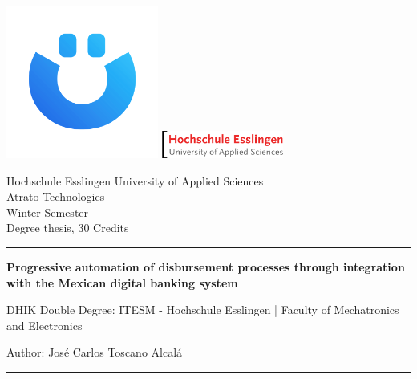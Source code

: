 
\begin{titlepage}
    \hspace{-1.5cm}
	\includegraphics[width=50mm]{assets/logoAtrato.png}
	\hfill
	\includegraphics[width=40mm]{assets/Hochschule-esslingen.svg.png}
	
	\noindent\begin{small} \sffamily
		\begin{minipage}{0.65\textwidth}
			Hochschule Esslingen University of Applied Sciences\\
			Atrato Technologies\\
			Winter Semester \the\year\\
			Degree thesis, 30 Credits\\
		\end{minipage}
	\hrule
	\end{small}

	\vspace{1cm}
	{\LARGE\noindent \textbf{Progressive automation of disbursement processes through integration with the Mexican digital banking system} \par}
	\vspace{0.5cm}
	{\Large\noindent DHIK Double Degree: ITESM - Hochschule Esslingen | Faculty of Mechatronics and Electronics \par}
	\vspace{2cm}
	{\LARGE\noindent Author: José Carlos Toscano Alcalá \par} %

	\vfill
		
	\hrule
	\vspace{0.3cm}
	
	

\end{titlepage}
